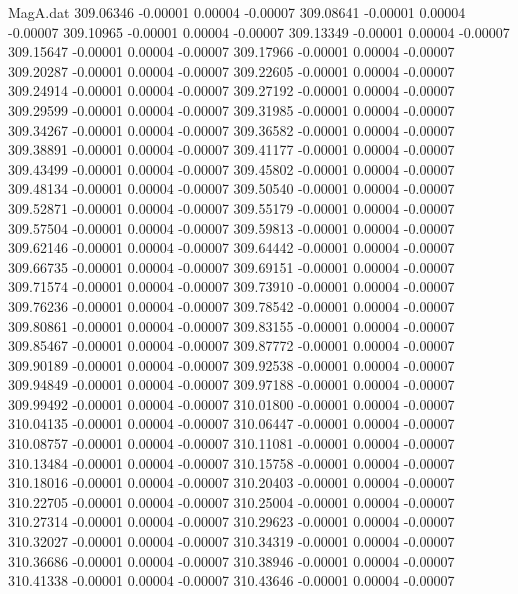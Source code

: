 \begin{filecontents}{MagA.dat}
 309.06346   -0.00001    0.00004   -0.00007
 309.08641   -0.00001    0.00004   -0.00007
 309.10965   -0.00001    0.00004   -0.00007
 309.13349   -0.00001    0.00004   -0.00007
 309.15647   -0.00001    0.00004   -0.00007
 309.17966   -0.00001    0.00004   -0.00007
 309.20287   -0.00001    0.00004   -0.00007
 309.22605   -0.00001    0.00004   -0.00007
 309.24914   -0.00001    0.00004   -0.00007
 309.27192   -0.00001    0.00004   -0.00007
 309.29599   -0.00001    0.00004   -0.00007
 309.31985   -0.00001    0.00004   -0.00007
 309.34267   -0.00001    0.00004   -0.00007
 309.36582   -0.00001    0.00004   -0.00007
 309.38891   -0.00001    0.00004   -0.00007
 309.41177   -0.00001    0.00004   -0.00007
 309.43499   -0.00001    0.00004   -0.00007
 309.45802   -0.00001    0.00004   -0.00007
 309.48134   -0.00001    0.00004   -0.00007
 309.50540   -0.00001    0.00004   -0.00007
 309.52871   -0.00001    0.00004   -0.00007
 309.55179   -0.00001    0.00004   -0.00007
 309.57504   -0.00001    0.00004   -0.00007
 309.59813   -0.00001    0.00004   -0.00007
 309.62146   -0.00001    0.00004   -0.00007
 309.64442   -0.00001    0.00004   -0.00007
 309.66735   -0.00001    0.00004   -0.00007
 309.69151   -0.00001    0.00004   -0.00007
 309.71574   -0.00001    0.00004   -0.00007
 309.73910   -0.00001    0.00004   -0.00007
 309.76236   -0.00001    0.00004   -0.00007
 309.78542   -0.00001    0.00004   -0.00007
 309.80861   -0.00001    0.00004   -0.00007
 309.83155   -0.00001    0.00004   -0.00007
 309.85467   -0.00001    0.00004   -0.00007
 309.87772   -0.00001    0.00004   -0.00007
 309.90189   -0.00001    0.00004   -0.00007
 309.92538   -0.00001    0.00004   -0.00007
 309.94849   -0.00001    0.00004   -0.00007
 309.97188   -0.00001    0.00004   -0.00007
 309.99492   -0.00001    0.00004   -0.00007
 310.01800   -0.00001    0.00004   -0.00007
 310.04135   -0.00001    0.00004   -0.00007
 310.06447   -0.00001    0.00004   -0.00007
 310.08757   -0.00001    0.00004   -0.00007
 310.11081   -0.00001    0.00004   -0.00007
 310.13484   -0.00001    0.00004   -0.00007
 310.15758   -0.00001    0.00004   -0.00007
 310.18016   -0.00001    0.00004   -0.00007
 310.20403   -0.00001    0.00004   -0.00007
 310.22705   -0.00001    0.00004   -0.00007
 310.25004   -0.00001    0.00004   -0.00007
 310.27314   -0.00001    0.00004   -0.00007
 310.29623   -0.00001    0.00004   -0.00007
 310.32027   -0.00001    0.00004   -0.00007
 310.34319   -0.00001    0.00004   -0.00007
 310.36686   -0.00001    0.00004   -0.00007
 310.38946   -0.00001    0.00004   -0.00007
 310.41338   -0.00001    0.00004   -0.00007
 310.43646   -0.00001    0.00004   -0.00007

\end{filecontents}

